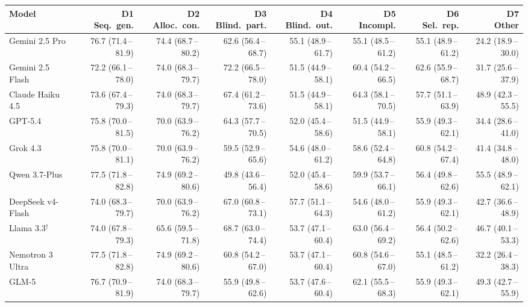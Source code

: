 \begin{tabular}{lrrrrrrr}
\toprule
Model & \makecell{D1\\Seq.\ gen.} & \makecell{D2\\Alloc.\ con.} & \makecell{D3\\Blind.\ part.} & \makecell{D4\\Blind.\ out.} & \makecell{D5\\Incompl.} & \makecell{D6\\Sel.\ rep.} & \makecell{D7\\Other} \\
\midrule
Gemini 2.5 Pro & 76.7 (71.4\,--\,81.9) & 74.4 (68.7\,--\,80.2) & 62.6 (56.4\,--\,68.7) & 55.1 (48.9\,--\,61.7) & 55.1 (48.5\,--\,61.2) & 55.1 (48.9\,--\,61.2) & 24.2 (18.9\,--\,30.0) \\
Gemini 2.5 Flash & 72.2 (66.1\,--\,78.0) & 74.0 (68.3\,--\,79.7) & 72.2 (66.5\,--\,78.0) & 51.5 (44.9\,--\,58.1) & 60.4 (54.2\,--\,66.5) & 62.6 (55.9\,--\,68.7) & 31.7 (25.6\,--\,37.9) \\
Claude Haiku 4.5 & 73.6 (67.4\,--\,79.3) & 74.0 (68.3\,--\,79.7) & 67.4 (61.2\,--\,73.6) & 51.5 (44.9\,--\,58.1) & 64.3 (58.1\,--\,70.5) & 57.7 (51.1\,--\,63.9) & 48.9 (42.3\,--\,55.5) \\
GPT-5.4 & 75.8 (70.0\,--\,81.5) & 70.0 (63.9\,--\,76.2) & 64.3 (57.7\,--\,70.5) & 52.0 (45.4\,--\,58.6) & 51.5 (44.9\,--\,58.1) & 55.9 (49.3\,--\,62.1) & 34.4 (28.6\,--\,41.0) \\
Grok 4.3 & 75.8 (70.0\,--\,81.1) & 70.0 (63.9\,--\,76.2) & 59.5 (52.9\,--\,65.6) & 54.6 (48.0\,--\,61.2) & 58.6 (52.4\,--\,64.8) & 60.8 (54.2\,--\,67.4) & 41.4 (34.8\,--\,48.0) \\
Qwen 3.7-Plus & 77.5 (71.8\,--\,82.8) & 74.9 (69.2\,--\,80.6) & 49.8 (43.6\,--\,56.4) & 52.0 (45.4\,--\,58.6) & 59.9 (53.7\,--\,66.1) & 56.4 (49.8\,--\,62.6) & 55.5 (48.9\,--\,62.1) \\
DeepSeek v4-Flash & 74.0 (68.3\,--\,79.7) & 70.0 (63.9\,--\,76.2) & 67.0 (60.8\,--\,73.1) & 57.7 (51.1\,--\,64.3) & 54.6 (48.0\,--\,61.2) & 55.9 (49.3\,--\,62.1) & 42.7 (36.6\,--\,48.9) \\
Llama 3.3$^\dagger$ & 74.0 (67.8\,--\,79.3) & 65.6 (59.5\,--\,71.8) & 68.7 (63.0\,--\,74.4) & 53.7 (47.1\,--\,60.4) & 63.0 (56.4\,--\,69.2) & 56.4 (50.2\,--\,62.6) & 46.7 (40.1\,--\,53.3) \\
Nemotron 3 Ultra & 77.5 (71.8\,--\,82.8) & 74.9 (69.2\,--\,80.6) & 60.8 (54.2\,--\,67.0) & 53.7 (47.1\,--\,60.4) & 60.8 (54.6\,--\,67.0) & 55.1 (48.5\,--\,61.2) & 32.2 (26.4\,--\,38.3) \\
GLM-5 & 76.7 (70.9\,--\,81.9) & 74.0 (68.3\,--\,79.7) & 55.9 (49.8\,--\,62.6) & 53.7 (47.6\,--\,60.4) & 62.1 (55.5\,--\,68.3) & 55.9 (49.3\,--\,62.1) & 49.3 (42.7\,--\,55.9) \\
\bottomrule
\end{tabular}